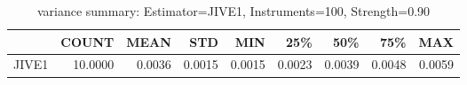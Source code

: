\begin{table}[ht]
\centering
\caption{variance summary: Estimator=JIVE1, Instruments=100, Strength=0.90}
\begin{tabular}{lrrrrrrrr}
\toprule
 & COUNT & MEAN & STD & MIN & 25\% & 50\% & 75\% & MAX \\
\midrule
JIVE1 & 10.0000 & 0.0036 & 0.0015 & 0.0015 & 0.0023 & 0.0039 & 0.0048 & 0.0059 \\
\bottomrule
\end{tabular}
\end{table}
